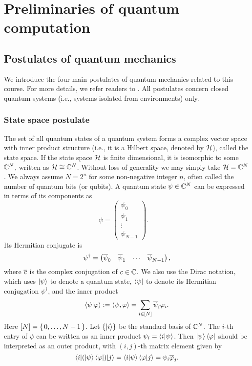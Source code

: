\chapter{Preliminaries of quantum computation}

\section{Postulates of quantum mechanics}\label{sec:postulate}

We introduce the four main postulates of quantum mechanics related to this course. 
For more details, we refer readers to \cite[Section 2.2]{NielsenChuang2000}.
All postulates concern closed quantum systems (i.e., systems isolated from environments) only.

\subsection{State space postulate}

The set of all quantum states of a quantum system forms a complex vector space with inner product structure (i.e., it is a Hilbert space, denoted by $\mathcal{H}$), called the state space. If the state space $\mathcal{H}$ is finite dimensional, it is isomorphic to some $\mathbb{C}^N$, written as $\mathcal{H}\cong \mathbb{C}^N$. Without loss of generality we may simply take $\mathcal{H}=\mathbb{C}^N$. We always assume $N=2^n$ for some non-negative integer $n$, often called the number of quantum bits (or qubits). A quantum state $\psi\in\mathbb{C}^N$ can be expressed in terms of its components as
\begin{equation}
\psi=\begin{pmatrix}
\psi_0\\ \psi_1 \\ \vdots \\ \psi_{N-1}
\end{pmatrix}.
 \quad 
\end{equation}
Its Hermitian conjugate is 
\begin{equation}
\psi^{\dag}=\begin{pmatrix}
\overline{\psi}_0& \overline{\psi}_1 & \cdots & \overline{\psi}_{N-1}
\end{pmatrix},
\end{equation}
where $\overline{c}$ is the complex conjugation of $c\in \mathbb{C}$. We also use the Dirac notation, which uses $\ket{\psi}$ to denote a quantum state, $\bra{\psi}$ to denote its Hermitian conjugation $\psi^{\dag}$,
and the inner product
\begin{equation}
\braket{\psi|\varphi}:=\braket{\psi,\varphi}=\sum_{i\in[N]} \overline{\psi}_i \varphi_i.
\end{equation}
Here $[N]=\set{0,\ldots,N-1}$. Let $\{\ket{i}\}$ be the standard basis of $\mathbb{C}^N$. The $i$-th entry of $\psi$ can be written as an inner product
$\psi_i=\braket{i|\psi}$. 
Then $\ket{\psi}\bra{\varphi}$ should be interpreted as an outer product, with $(i,j)$-th matrix element given by
\begin{equation}
\braket{i|(\ket{\psi}\bra{\varphi})|j}=\braket{i|\psi}\braket{\varphi|j}=\psi_i \overline{\varphi}_j.
\end{equation}



